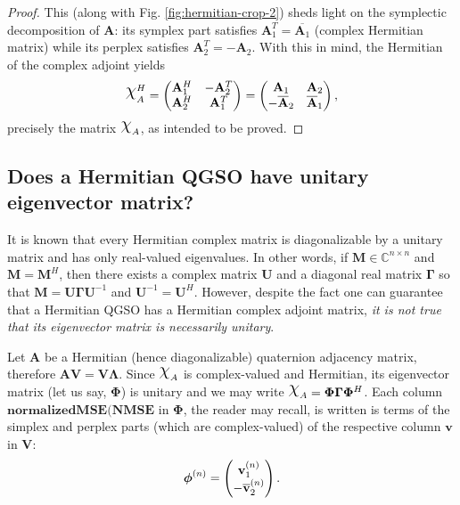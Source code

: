 \begin{proof}
This (along with Fig. \ref{fig:hermitian-crop-2}) sheds light on the symplectic decomposition of $\mathbf{A}$: its symplex part satisfies $\mathbf{A}^T_1 = \overline{\mathbf{A}_1}$ (complex Hermitian matrix) while its perplex satisfies $\mathbf{A}^T_2 = - \mathbf{A}_2$.
With this in mind, the Hermitian of the complex adjoint yields
\begin{equation}
\rchi_A^H = 
\begin{pmatrix}
\mathbf{A}^H_1 & - \mathbf{A}^T_2\\ 
\mathbf{A}^H_2 & \mathbf{A}^T_1
\end{pmatrix}
=
\begin{pmatrix}
\mathbf{A}_1 & \mathbf{A}_2\\ 
-\overline{\mathbf{A}}_2 & \overline{\mathbf{A}}_1
\end{pmatrix},
\end{equation}
precisely the matrix $\rchi_A$, as intended to be proved.
\end{proof}

\subsection{Does a Hermitian QGSO have unitary eigenvector matrix?}

It is known that every Hermitian complex matrix is diagonalizable by a unitary matrix and has only real-valued eigenvalues. In other words, if $\mathbf{M} \in \mathbb{C}^{n \times n}$ and $\mathbf{M} = \mathbf{M}^H$, then there exists a complex matrix $\mathbf{U}$ and a diagonal real matrix $\mathbf{\Gamma}$ so that $\mathbf{M} = \mathbf{U} \mathbf{\Gamma} \mathbf{U}^{-1}$ and $\mathbf{U}^{-1} = \mathbf{U}^H$. However, despite the fact one can guarantee that a Hermitian QGSO has a Hermitian complex adjoint matrix, \textit{it is not true that its eigenvector matrix is necessarily unitary}.

Let $\mathbf{A}$ be a Hermitian (hence diagonalizable) quaternion adjacency matrix, therefore $\mathbf{A} \mathbf{V} = \mathbf{V} \mathbf{\Lambda}$. Since $\rchi_{A}$ is complex-valued and Hermitian, its eigenvector matrix (let us say, $\mathbf{\Phi}$) is unitary and we may write $\rchi_{A} = \mathbf{\Phi} \mathbf{\Gamma} \mathbf{\Phi}^H$. Each column $\mathbf{ normalized MSE (NMSE}$ in $\mathbf{\Phi}$, the reader may recall, is written is terms of the simplex and perplex parts (which are complex-valued) of the respective column $\mathbf{v}$ in $\mathbf{V}$:
\begin{equation}
\mathbf{\boldsymbol{\phi}}^{(n)} = 
\begin{pmatrix}
\mathbf{v}^{(n)}_1 \\ 
- \overline{\mathbf{v}}^{(n)}_2
\end{pmatrix}.
\end{equation}

